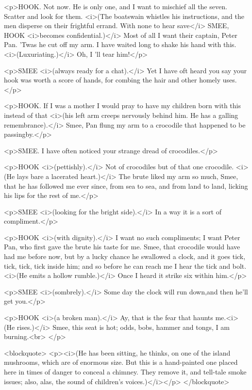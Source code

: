 <p>HOOK. Not now. He is only one, and I want to mischief all the
seven. Scatter and look for them. <i>(The boatswain whistles his
instructions, and the men disperse on their frightful errand. With
none to hear save</i> SMEE, HOOK <i>becomes confidential.)</i> Most
of all I want their captain, Peter Pan. 'Twas he cut off my arm. I
have waited long to shake his hand with this. <i>(Luxuriating.)</i>
Oh, I 'll tear him!</p>

<p>SMEE <i>(always ready for a chat).</i> Yet I have oft heard you
say your hook was worth a score of hands, for combing the hair and
other homely uses.</p>

<p>HOOK. If I was a mother I would pray to have my children born with
this instead of that <i>(his left arm creeps nervously behind him. He
has a galling remembrance).</i> Smee, Pan flung my arm to a crocodile
that happened to be passingby.</p>

<p>SMEE. I have often noticed your strange dread of crocodiles.</p>

<p>HOOK <i>(pettishly).</i> Not of crocodiles but of that one
crocodile. <i>(He lays bare a lacerated heart.)</i> The brute liked
my arm so much, Smee, that he has followed me ever since, from sea to
sea, and from land to land, licking his lips for the rest of me.</p>

<p>SMEE <i>(looking for the bright side).</i> In a way it is a sort
of compliment.</p>

<p>HOOK <i>(with dignity).</i> I want no such compliments; I want
Peter Pan, who first gave the brute his taste for me. Smee, that
crocodile would have had me before now, but by a lucky chance he
swallowed a clock, and it goes tick, tick, tick, tick inside him; and
so before he can reach me I hear the tick and bolt. <i>(He emits a
hollow rumble.)</i> Once I heard it strike six within him.</p>

<p>SMEE <i>(sombrely).</i> Some day the clock will run down,and then
he'll get you.</p>

<p>HOOK <i>(a broken man).</i> Ay, that is the fear that haunts
me.<i>(He rises.)</i> Smee, this seat is hot; odds, bobs, hammer and
tongs, I am burning.<br>
</p>

<blockquote>
<p><i>(He has been sitting, he thinks, on one of the island
mushrooms, which are of enormous size. But this is a hand-painted one
placed here in times of danger to conceal a chimney. They remove it,
and tell-tale smoke issues; also, alas, the sound of children's
voices.)</i></p>
</blockquote>

